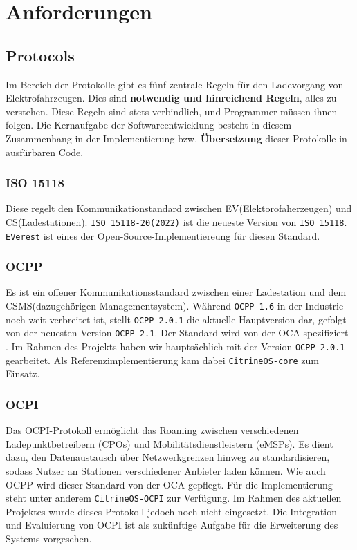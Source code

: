 \documentclass[12pt,a4paper]{report}
\begin{document}
    \chapter{ Anforderungen }
    
    \section{ Protocols }
    Im Bereich der Protokolle gibt es fünf zentrale Regeln für den Ladevorgang von Elektrofahrzeugen.
    Dies sind \textbf{notwendig und hinreichend Regeln}, alles zu verstehen.
    Diese Regeln sind stets verbindlich, und Programmer müssen ihnen folgen.
    Die Kernaufgabe der Softwareentwicklung besteht in diesem Zusammenhang in der Implementierung bzw. 
    \textbf{Übersetzung} dieser Protokolle in ausfürbaren Code.
    
    \subsection{ ISO 15118 }
    Diese regelt den Kommunikationstandard zwischen EV(Elektorofaherzeugen) und CS(Ladestationen).    
    \texttt{ISO 15118-20(2022)} ist die neueste Version von \texttt{ISO 15118}.
    \texttt{EVerest} ist eines der Open-Source-Implementiereung für diesen Standard.
    \cite{ISO15118}

    \subsection{ \texorpdfstring{\gls{OCPP}}{OCPP} }
    Es ist ein offener Kommunikationsstandard zwischen einer Ladestation 
    und dem CSMS(dazugehörigen Managementsystem).
    Während \texttt{OCPP 1.6} in der Industrie noch weit verbreitet ist, stellt \texttt{OCPP 2.0.1} 
    die aktuelle Hauptversion dar, gefolgt von der neuesten Version \texttt{OCPP 2.1}. Der Standard wird von der \gls{OCA} spezifiziert \cite{OCA}.
    Im Rahmen des Projekts haben wir hauptsächlich mit der Version 
    \texttt{OCPP 2.0.1} gearbeitet. 
    Als Referenzimplementierung kam dabei \texttt{CitrineOS-core} zum Einsatz.

    \subsection{ \texorpdfstring{\gls{OCPI}}{OCPI} } 
    Das \gls{OCPI}-Protokoll ermöglicht das Roaming zwischen verschiedenen Ladepunktbetreibern (\gls{CPO}s) 
    und Mobilitätsdienstleistern (\gls{eMSP}s). 
    Es dient dazu, den Datenaustausch über Netzwerkgrenzen hinweg zu standardisieren,
     sodass Nutzer an Stationen verschiedener Anbieter laden können. 
     Wie auch \gls{OCPP} wird dieser Standard von der \gls{OCA} gepflegt.
    Für die Implementierung steht unter anderem \texttt{CitrineOS-OCPI} zur Verfügung. 
    Im Rahmen des aktuellen Projektes wurde dieses Protokoll jedoch noch nicht eingesetzt. 
    Die Integration und Evaluierung von \gls{OCPI} ist als zukünftige Aufgabe für die Erweiterung des Systems vorgesehen.
\end{document}
